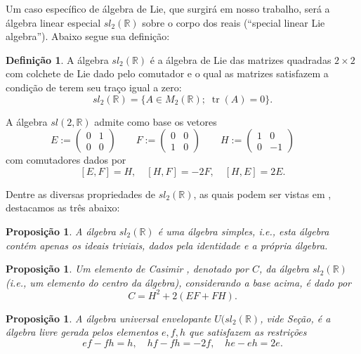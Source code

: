 \documentclass[twoside,openright,titlepage,numbers=noenddot,headinclude,  lineheaders footinclude=true,cleardoublepage=empty,
                                BCOR=5mm,paper=a4,fontsize=12pt ]{scrbook}
\DeclareMathOperator\tr{tr}
\newtheorem{prop}[teo]{Proposição}
\theoremstyle{definition}
\newtheorem{definicao}{Definição}[chapter]
\begin{document}
Um caso específico de álgebra de Lie, que surgirá em nosso trabalho, será 
a álgebra linear especial 
$sl_2(\mathbb{R})$ sobre o corpo dos reais
(``special linear Lie algebra''). Abaixo segue sua definição:

\begin{definicao}
A álgebra $sl_2(\mathbb{R})$ é 
a álgebra de Lie das matrizes quadradas $2 \times 2$ com
colchete de Lie dado pelo comutador e o qual as matrizes 
satisfazem a condição de terem
seu traço igual a zero:
\[
sl_2(\mathbb{R}) = \{A \in M_2(\mathbb{R}); \; \tr(A) = 0\}.
\]
\end{definicao}
A álgebra $sl(2, \mathbb{R})$ admite como base os vetores
\[
E := 
\begin{pmatrix}
0&1\\
0&0
\end{pmatrix}
\qquad
F := 
\begin{pmatrix}
0&0\\
1&0
\end{pmatrix}
\qquad
H := 
\begin{pmatrix}
1&0\\
0&-1
\end{pmatrix}
\qquad
\]
com comutadores dados por
\[
[E,F] = H, \quad [H,F] = -2F, \quad [H,E] = 2E.
\]

Dentre as diversas	propriedades de $sl_2(\mathbb{R})$, as quais podem ser
vistas em \cite{lang}, destacamos as três abaixo:

\begin{prop}
A álgebra $sl_2(\mathbb{R})$ é uma álgebra simples, i.e., esta álgebra contém apenas
os ideais triviais, dados pela identidade e a própria álgebra.
\end{prop}

\begin{prop}
Um elemento de Casimir , denotado por $C$,
 da álgebra $sl_2(\mathbb{R})$(i.e., um elemento do centro da álgebra), considerando a base 
acima, é dado por
\[
C = H^2 + 2(E F  + F H).
\]
\end{prop}

\begin{prop}
A álgebra universal envelopante $U(sl_2(\mathbb{R})$, vide Seção,
é a álgebra livre gerada pelos elementos $e, f, h$ que satisfazem
as restrições
\[
e f -f h = h, \quad h f -f h = -2f, \quad h e - e h = 2e.
\]
\end{prop}

\end{document}
